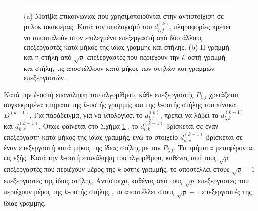 \documentclass[12pt,a4paper]{article}
\begin{document}
\begin{figure}[H]
\vspace{0.3cm}
\noindent\rule{\textwidth}{0.2pt}
\caption{(a) Μοτίβα επικοινωνίας που χρησιμοποιούνται στην αντιστοίχιση σε μπλοκ
σκακιέρας. Κατά τον υπολογισμό του $d^{(k)}_{i,j}$, πληροφορίες πρέπει να
αποσταλούν στον επιλεγμένο επεξεργαστή από δύο άλλους επεξεργαστές κατά
μήκος της ίδιας γραμμής και στήλης. (b) Η γραμμή και η στήλη από $\sqrt{p}$
επεξεργαστές που περιέχουν την $k$-οστή γραμμή και στήλη, τις αποστέλλουν κατά
μήκος των στηλών και γραμμών επεξεργαστών.}
\label{fig:graph10}
\end{figure}

Κατά την $k$-οστή επανάληψη του αλγορίθμου, κάθε επεξεργαστής $P_{i,j}$ χρειάζεται 
συγκεκριμένα τμήματα της $k$-οστής γραμμής και της $k$-οστής στήλης του πίνακα 
$D^{(k-1)}$. Για παράδειγμα, για να υπολογίσει το $d^{(k)}_{l,r}$, πρέπει να λάβει 
τα $d^{(k-1)}_{l,k}$ και $d^{(k-1)}_{k,r}$.
Όπως φαίνεται στο Σχήμα \ref{fig:graph10} , το $d^{(k-1)}_{l,k}$ βρίσκεται σε έναν επεξεργαστή 
κατά μήκος της ίδιας γραμμής, ενώ το στοιχείο $d^{(k-1)}_{k,r}$ βρίσκεται σε έναν 
επεξεργαστή κατά μήκος της ίδιας στήλης με τον $P_{i,j}$.
Τα τμήματα μεταφέρονται ως εξής. Κατά την $k$-οστή επανάληψη του αλγορίθμου, 
καθένας από τους $\sqrt{p}$ επεξεργαστές που περιέχουν μέρος της $k$-οστής γραμμής, το αποστέλλει στους $\sqrt{p} - 1$ επεξεργαστές της ίδιας στήλης. Αντίστοιχα, 
καθένας από τους $\sqrt{p}$ επεξεργαστές που περιέχουν μέρος της $k$-οστής στήλης , το αποστέλλει στους $\sqrt{p} - 1$ επεξεργαστές της ίδιας γραμμής.
\end{document}
